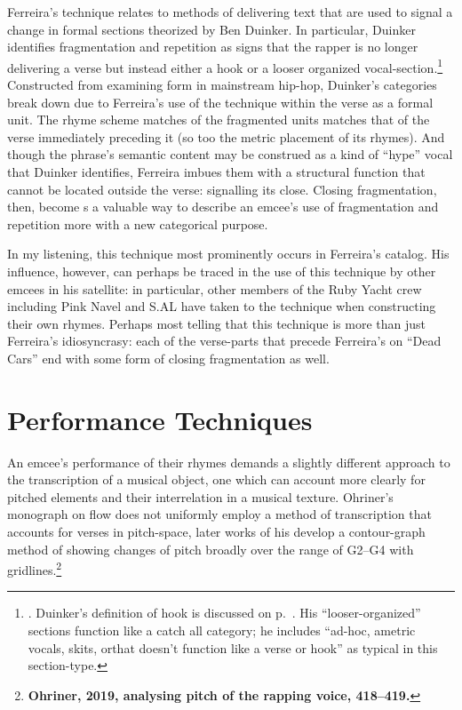 Ferreira's technique relates to methods of delivering text that are used to signal a change
in formal sections theorized by Ben Duinker. In particular, Duinker identifies fragmentation
and repetition as signs that the rapper is no longer delivering a verse but instead either a
hook or a looser organized vocal-section.\footnote{
    \autocite[98--101]{benduinkerSongFormMainstreaming2020}. Duinker's definition of hook is 
    discussed on p.~\pageref{duinkerhookdef}. His ``looser-organized'' sections function like
    a catch all category; he includes ``ad-hoc, ametric vocals, skits, or\textellipsis [rapping]
    that doesn't function like a verse or hook'' as typical in this section-type.}
Constructed from examining form in mainstream hip-hop, Duinker's categories break down due to
Ferreira's use of the technique within the verse as a formal unit. The rhyme scheme matches of
the fragmented units matches that of the verse immediately preceding it (so too the metric 
placement of its rhymes). And though the phrase's semantic content may be construed as a kind
of ``hype'' vocal that Duinker identifies, Ferreira imbues them with a structural function that
cannot be located outside the verse: signalling its close. Closing fragmentation, then, become
s a valuable way to describe an emcee's use of fragmentation and repetition more with a new 
categorical purpose. 

In my listening, this technique most prominently occurs in Ferreira's catalog. His influence, 
however, can perhaps be traced in the use of this technique by other emcees in his satellite:
in particular, other members of the Ruby Yacht crew including Pink Navel and S.AL have taken 
to the technique when constructing their own rhymes. Perhaps most telling that this technique
is more than just Ferreira's  idiosyncrasy: each of the verse-parts that precede Ferreira's on
``Dead Cars'' end with some form of closing fragmentation as well.

\section{Performance Techniques}

An emcee's performance of their rhymes demands a slightly different approach to the transcription
of a musical object, one which can account more clearly for pitched elements and their interrelation
in a musical texture. Ohriner's monograph on flow does not uniformly employ a method of transcription
that accounts for verses in pitch-space, later works of his develop a contour-graph method of showing
changes of pitch broadly over the range of G2--G4 with gridlines.\footnote{
    \textbf{Ohriner, 2019, analysing pitch of the rapping voice, 418--419.}}

